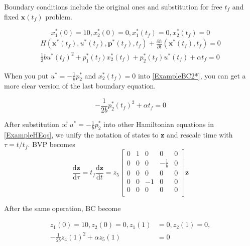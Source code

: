 \documentclass[twoside]{article}
\begin{document}
Boundary conditions include the original ones and substitution for free $t_f$ and fixed $\textbf{x}(t_f)$ problem.

\begin{equation}\label{ExampleBC1*}
x_1^*(0) = 10, x_2^*(0) = 0, x_1^*(t_f) = 0, x_2^*(t_f) = 0
\end{equation}
\begin{equation}\label{ExampleBC2*}
\begin{split}
H(\textbf{x}^*(t_f), u^*(t_f), \textbf{p}^*(t_f), t_f)+\frac{\partial{h}}{\partial{t}}(\textbf{x}^*(t_f),t_f) = 0 \\
\frac{1}{2}bu^*(t_f)^2 + p_1^*(t_f)x_2^*(t_f)+p_2^*(t_f)u^*(t_f) + \alpha t_f = 0
\end{split}
\end{equation}

When you put $u^* = -\frac{1}{b}p_2^*$ and $x_2^*(t_f) = 0$ into \eqref{ExampleBC2*}, you can get a more clear version of the last boundary equation.

\begin{equation}\label{ExampleBC2*Clear}
-\frac{1}{2b}p_2^*(t_f)^2 + \alpha t_f = 0
\end{equation}

After substitution of $u^* = -\frac{1}{b}p_2^*$ into other Hamiltonian equations in \eqref{ExampleHEqs}, we unify the notation of states to \textbf{z} and rescale time with $\tau = t/t_f$. BVP becomes
\begin{equation}\label{FinalBVP}
\frac{\mathrm{d}\textbf{z}}{\mathrm{d}\tau} = t_f\frac{\mathrm{d}\textbf{z}}{\mathrm{d}t}
= z_5\begin{bmatrix}
    0 & 1 & 0  & 0                & 0 \\
    0 & 0 & 0  & -\frac{1}{b} & 0 \\
    0 & 0 & 0  & 0                & 0 \\
    0 & 0 & -1 & 0                & 0 \\
    0 & 0 & 0  & 0                & 0 \\
\end{bmatrix} \textbf{z}
\end{equation}

After the same operation, BC become

\begin{equation}\label{FinalBC}
\begin{split}
z_1(0) = 10, z_2(0) = 0, z_1(1) &= 0, z_2(1) = 0, \\
-\frac{1}{2b}z_4(1)^2 + \alpha z_5(1) &= 0
\end{split}
\end{equation}
\end{document}
